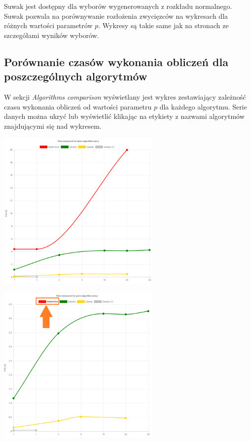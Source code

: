 \documentclass[pdflatex,11pt]{../aghdoc_version2}
\begin{document}
\vspace{\baselineskip}
Suwak jest dostępny dla wyborów wygenerowanych z rozkładu normalnego. Suwak pozwala na porównywanie rozłożenia zwycięzców na wykresach dla różnych wartości parametrów $p$. Wykresy są takie same jak na stronach ze szczegółami wyników wyborów. 

\newpage
\subsection{Porównanie czasów wykonania obliczeń dla poszczególnych algorytmów}
\label{subsec:wykresczasuobliczen}

W sekcji \textit{Algorithms comparison} wyświetlany jest wykres zestawiający zależność czasu 
wykonania obliczeń od wartości parametru $p$ dla każdego algorytmu. Serie danych można ukryć lub 
wyświetlić klikając na etykiety z nazwami algorytmów znajdującymi się nad wykresem.

\begin{center}
\includegraphics[width=0.6\textwidth]{pics/algorithms-comparison-1.png}
\end{center}

\begin{center}
\includegraphics[width=0.6\textwidth]{pics/algorithms-comparison-2.png}
\end{center}
\end{document}
